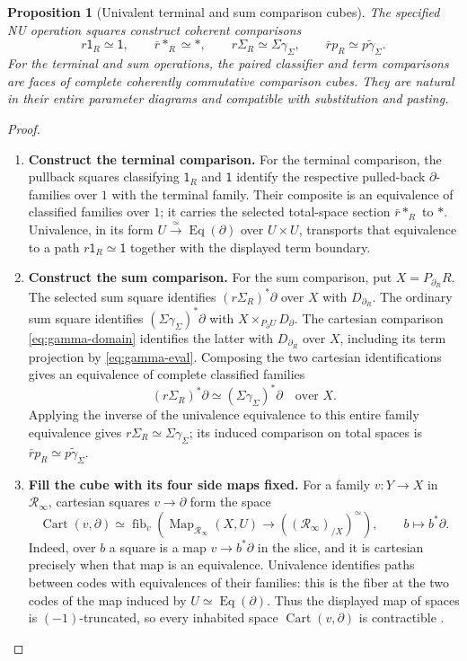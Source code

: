 \documentclass[oneside]{article}
\theoremstyle{plain}
\newtheorem{proposition}[theorem]{Proposition}
\theoremstyle{definition}
\theoremstyle{remark}
\newcommand{\Eq}{\operatorname{Eq}}
\newcommand{\Map}{\operatorname{Map}}
\newcommand{\RNU}{\mathcal R_{\infty}}
\newcommand{\core}{\simeq}
\newcommand{\fib}{\operatorname{fib}}
\begin{document}
\begin{proposition}[Univalent terminal and sum comparison cubes]
\label{prop:nu-univalent-cubes}
The specified NU operation squares construct coherent comparisons
\begin{equation}\label{eq:nu-operation-comparisons}
 r\mathsf 1_R\simeq\mathsf 1,\qquad
 \bar r *_R\simeq *,\qquad
 r\Sigma_R\simeq\Sigma\gamma_\Sigma,\qquad
 \bar r p_R\simeq p\widetilde\gamma_\Sigma.
\end{equation}
For the terminal and sum operations, the paired classifier and term
comparisons are faces of complete coherently commutative comparison
cubes. They are natural in their entire parameter diagrams and
compatible with substitution and pasting.
\end{proposition}
\begin{proof}
\leavevmode
\begin{enumerate}
\item \textbf{Construct the terminal comparison.}
For the terminal comparison, the pullback squares classifying
$\mathsf 1_R$ and $\mathsf 1$ identify the respective pulled-back
$\partial$-families over $1$ with the terminal family. Their composite
is an equivalence of classified families over $1$; it carries the
selected total-space section $\bar r *_R$ to $*$. Univalence, in
its form $U\xrightarrow{\simeq}\Eq(\partial)$ over $U\times U$,
transports that equivalence to a path
$r\mathsf 1_R\simeq\mathsf 1$ together with the displayed term
boundary.


\item \textbf{Construct the sum comparison.}
For the sum comparison, put $X=P_{\partial_R}R$. The selected sum
square identifies $(r\Sigma_R)^*\partial$ over $X$ with
$D_{\partial_R}$. The ordinary sum square identifies
$(\Sigma\gamma_\Sigma)^*\partial$ with
$X\times_{P_\partial U}D_\partial$. The cartesian comparison
\eqref{eq:gamma-domain} identifies the latter with
$D_{\partial_R}$ over $X$, including its term projection by
\eqref{eq:gamma-eval}. Composing the two cartesian identifications
gives an equivalence of complete classified families
\[
 (r\Sigma_R)^*\partial
 \simeq(\Sigma\gamma_\Sigma)^*\partial
 \quad\text{over }X.
\]
Applying the inverse of the univalence equivalence to this entire
family equivalence gives $r\Sigma_R\simeq\Sigma\gamma_\Sigma$;
its induced comparison on total spaces is
$\bar r p_R\simeq p\widetilde\gamma_\Sigma$. 
\item \textbf{Fill the cube with its four side maps fixed.}
For a family $v:Y\to X$ in $\RNU$, cartesian squares $v\to\partial$
form the space
\[
 \operatorname{Cart}(v,\partial)\simeq
 \fib_v\!\left(\Map_{\RNU}(X,U)\longrightarrow
                    ((\RNU)_{/X})^\core\right),\qquad b\longmapsto b^*\partial .
\]
Indeed, over $b$ a square is a map $v\to b^*\partial$ in the slice,
and it is cartesian precisely when that map is an equivalence.
Univalence identifies paths between codes with equivalences of their
families: this is the fiber at the two codes of the map induced by
$U\simeq\Eq(\partial)$. Thus the displayed map of spaces is
$(-1)$-truncated, so every inhabited space
$\operatorname{Cart}(v,\partial)$ is contractible
\cite[Prop.~5.8(3)]{NguyenUemura2025}.


\end{enumerate}
\end{proof}
\end{document}
